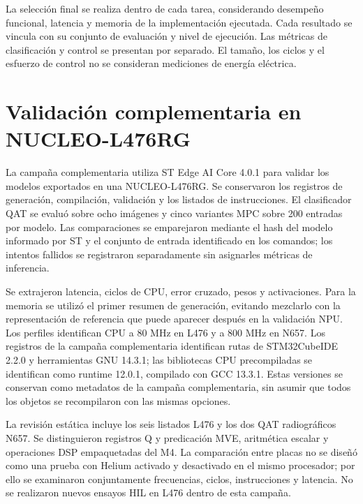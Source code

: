 La selección final se realiza dentro de cada tarea, considerando desempeño funcional, latencia y memoria de la implementación ejecutada. Cada resultado se vincula con su conjunto de evaluación y nivel de ejecución. Las métricas de clasificación y control se presentan por separado. El tamaño, los ciclos y el esfuerzo de control no se consideran mediciones de energía eléctrica.


\section{Validación complementaria en NUCLEO-L476RG}\label{sec:metodo_l476}
La campaña complementaria utiliza ST Edge AI Core 4.0.1 para validar los modelos exportados en una NUCLEO-L476RG. Se conservaron los registros de generación, compilación, validación y los listados de instrucciones. El clasificador QAT se evaluó sobre ocho imágenes y cinco variantes MPC sobre 200 entradas por modelo. Las comparaciones se emparejaron mediante el hash del modelo informado por ST y el conjunto de entrada identificado en los comandos; los intentos fallidos se registraron separadamente sin asignarles métricas de inferencia.

Se extrajeron latencia, ciclos de CPU, error cruzado, pesos y activaciones. Para la memoria se utilizó el primer resumen de generación, evitando mezclarlo con la representación de referencia que puede aparecer después en la validación NPU. Los perfiles identifican CPU a 80 MHz en L476 y a 800 MHz en N657. Los registros de la campaña complementaria identifican rutas de STM32CubeIDE 2.2.0 y herramientas GNU 14.3.1; las bibliotecas CPU precompiladas se identifican como runtime 12.0.1, compilado con GCC 13.3.1. Estas versiones se conservan como metadatos de la campaña complementaria, sin asumir que todos los objetos se recompilaron con las mismas opciones.

La revisión estática incluye los seis listados L476 y los dos QAT radiográficos N657. Se distinguieron registros Q y predicación MVE, aritmética escalar y operaciones DSP empaquetadas del M4. La comparación entre placas no se diseñó como una prueba con Helium activado y desactivado en el mismo procesador; por ello se examinaron conjuntamente frecuencias, ciclos, instrucciones y latencia. No se realizaron nuevos ensayos HIL en L476 dentro de esta campaña.
